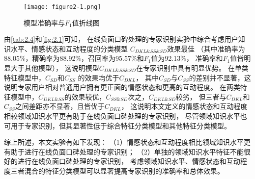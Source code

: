 \begin{figure}[th]
    
    \centering
    \texttt{[image: figure2-1.png]}
    \vskip -10pt
    \caption{模型准确率与$F_1$值折线图}\label{fig:2.1}
\end{figure}

由\autoref{tab:2.4}和\autoref{fig:2.1}可知，
在线负面口碑处理的专家识别实验中综合考虑用户知识水平、情感状态和互动程度的分类模型
$C_{DKL \& SS \& SD}$效果最佳
（其中准确率为88.05\%，精确率为88.92\%，召回率为95.57\%和$F_1$值为92.13\%，
准确率和$F_1$值皆明显大于其他模型），
这说明模型$C_{DKL \& SS \& SD}$在专家识别中具有明显优势。
在单类特征模型中，$C_{SD}$和$C_{SS}$ 的效果均优于$C_{DKL}$，
其中$C_{SD}$与$C_{SS}$的差别并不显著，这说明专家用户相对普通用户拥有更正面的情感状态和更高的互动程度。
在两类特征模型中，$C_{DKL \& SS}$的效果较优，$C_{SS \& SD}$次之，$C_{DKL \& SD}$较劣，
但三者与$C_{DKL}$和$C_{SS}$之间差距亦不显著，且皆优于$C_{DKL}$，
这说明本文定义的情感状态和互动程度相较领域知识水平更有助于在线负面口碑处理的专家识别，
尽管领域知识水平也可用于专家识别，但其显著性低于综合特征分类模型和其他特征分类模型。

综上所述，本文实验有如下发现：
（1）情感状态和互动程度相比领域知识水平更有助于进行在线负面口碑处理的专家识别；
（2）单独的领域知识水平特征不能很好的进行在线负面口碑处理的专家识别，
考虑领域知识水平、情感状态和互动程度三者混合的特征分类模型可以显著提高专家识别的准确率和总体效果。